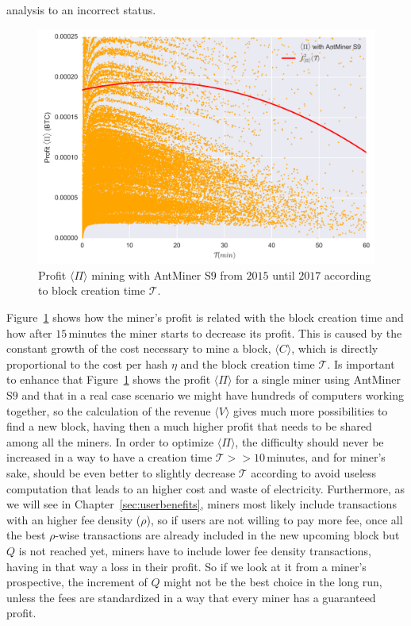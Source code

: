 \documentclass[USenglish]{uit-thesis}
\begin{document}
analysis to an incorrect status.
\begin{figure}[h]
	\centering
	\includegraphics[width=1\textwidth]{img/profit_creation_time}
	\caption{Profit $\langle \Pi \rangle$ mining with AntMiner S$9$ from
		$2015$ until $2017$ according to block creation time $\mathcal{T}$.}
	\label{fig:profit_creation_time}
\end{figure}
Figure~\ref{fig:profit_creation_time} shows how the
miner's profit is related with the block creation time and how
after $15$\,minutes the miner starts to decrease its profit.
This is caused by the constant growth of the cost
necessary to mine a block, $\langle C \rangle$,
which is directly proportional to the cost per hash $\eta$ and
the block creation time $\mathcal{T}$.
Is important to enhance that Figure~\ref{fig:profit_creation_time} shows
the profit $\langle \Pi \rangle$ for a single miner
using AntMiner S$9$ and that in a real
case scenario we might have hundreds of
computers working together, so the calculation
of the revenue $\langle V \rangle$ gives much
more possibilities to find a new block, having then
a much higher profit that needs to be shared
among all the miners. 
In order to optimize $\langle \Pi \rangle$, the
difficulty should never be increased in a way to
have a creation time $\mathcal{T} >> 10$\,minutes,
and for miner's sake, should be even better to slightly
decrease $\mathcal{T}$ according to avoid
useless computation that leads to an higher cost and waste
of electricity.
Furthermore, as we will see in
Chapter~\ref{sec:userbenefits}, miners most likely
include transactions with an higher fee density ($\rho$),
so if users are not willing to pay more fee,
once all the best $\rho$-wise
transactions are already included in the new upcoming block
but $Q$ is not reached yet, miners
have to include lower fee density
transactions, having in that way a loss in their profit.
So if we look at it from a miner's prospective, the increment
of $Q$ might not be the best choice in the long run, unless the
fees are standardized in a way that every
miner has a guaranteed profit.
\end{document}

